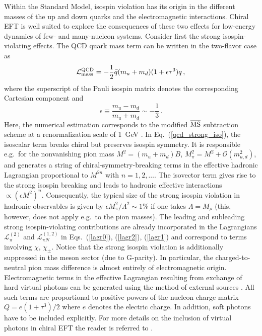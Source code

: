 \documentclass[aps,rmp,nofootinbib,twocolumn,floatfix]{revtex4}
\newcommand{\beq}{\begin{equation}}
\newcommand{\eeq}{\end{equation}}
\begin{document}
Within the Standard Model,
isospin violation has its origin in the different masses of the up and down
quarks and the electromagnetic interactions. Chiral EFT is well suited to
explore the consequences of these two effects for low-energy dynamics of few-
and many-nucleon systems. Consider first the strong isospin-violating
effects. The QCD quark mass term can be written in the two-flavor case as
\beq
\label{qcd_strong_iso}
\mathcal{L}_{\rm mass}^{\rm QCD} = - \frac{1}{2} \bar q (m_u + m_d ) (1 +
\epsilon \tau^3 ) q\,,
\eeq
where the superscript of the Pauli isospin matrix denotes the corresponding
Cartesian component and 
\beq
\epsilon \equiv \frac{m_u - m_d}{m_u + m_d} \sim - \frac{1}{3}\,.
\eeq
Here, the numerical estimation corresponds to the modified  $\overline{\rm
  MS}$ subtraction scheme 
at a renormalization scale of 1~GeV \cite{Leutwyler:1996qg}. In
Eq.~(\ref{qcd_strong_iso}), the isoscalar term breaks chiral but preserves
isospin symmetry. It is responsible e.g.~for the nonvanishing pion mass
$M^2 = (m_u +m_d) B$, $M_\pi^2 = M^2 + \mathcal{O} (m_{u,d}^2)$,  and
generates a string of 
chiral-symmetry-breaking terms in the effective hadronic Lagrangian 
proportional to $M^{2n}$ with $n=1, 2, \ldots$. The
isovector term gives rise to the strong isospin breaking and leads to hadronic
effective interactions $\propto (\epsilon M^2)^n$. Consequently, the typical
size of the strong isospin violation in hadronic observables is given by 
$\epsilon M_\pi^2 / \Lambda^2 \sim 1\%$ if one takes $\Lambda = M_\rho$ (this,
however, does not apply e.g.~to the
pion masses). The leading and subleading strong isospin-violating
contributions are already incorporated in the Lagrangians $\mathcal{L}_{\pi}^{(2)}$
and $\mathcal{L}_{\pi N}^{(1,2)}$ in Eqs.~(\ref{lagr0}), (\ref{lagr2}),
(\ref{lagr1})  and correspond to terms involving $\chi$, $\chi_\pm$. Notice
that the strong isospin violation is additionally suppressed in the meson
sector (due to G-parity). In particular, the charged-to-neutral pion mass
difference is almost entirely of electromagnetic origin.  
Electromagnetic terms in the effective Lagrangian resulting from
exchange of hard virtual photons can be generated using the method of external
sources \cite{Gasser:1983yg}. 
All such terms are proportional to positive powers of the
nucleon charge matrix $Q = e (1 + \tau^3 )/2$ where $e$ denotes the electric
charge.  In addition, soft photons have
to be included explicitly. For more details on the inclusion of virtual
photons in chiral EFT the reader is referred to 
\cite{Urech:1994hd,Neufeld:1995mu,Meissner:1997fa,Knecht:1997jw,Meissner:1997ii,
Muller:1999ww,Gasser:2002am}.    
\end{document}

